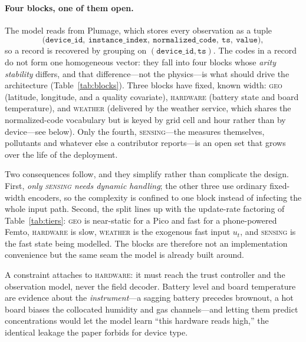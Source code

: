 \documentclass[10pt]{article}
\begin{document}
\paragraph{Four blocks, one of them open.}
The model reads from Plumage, which stores every observation as a tuple
\begin{equation}
\big(\texttt{device\_id},\ \texttt{instance\_index},\ \texttt{normalized\_code},\
\texttt{ts},\ \texttt{value}\big),
\label{eq:tuple}
\end{equation}
so a record is recovered by grouping on $(\texttt{device\_id},\texttt{ts})$. The
codes in a record do not form one homogeneous vector: they fall into four blocks
whose \emph{arity stability} differs, and that difference---not the physics---is
what should drive the architecture (Table~\ref{tab:blocks}). Three blocks have
fixed, known width: \textsc{geo} (latitude, longitude, and a quality covariate),
\textsc{hardware} (battery state and board temperature), and \textsc{weather}
(delivered by the weather service, which shares the normalized-code vocabulary but
is keyed by grid cell and hour rather than by device---see below). Only
the fourth, \textsc{sensing}---the measures themselves, pollutants and whatever
else a contributor reports---is an open set that grows over the life of the deployment.

Two consequences follow, and they simplify rather than complicate the design.
First, \emph{only \textsc{sensing} needs dynamic handling}; the other three use
ordinary fixed-width encoders, so the complexity is confined to one block instead
of infecting the whole input path. Second, the split lines up with the update-rate
factoring of Table~\ref{tab:tiers}: \textsc{geo} is near-static for a Pico and fast
for a phone-powered Femto, \textsc{hardware} is slow, \textsc{weather} is the exogenous
fast input $u_t$, and \textsc{sensing} is the fast state being modelled. The blocks
are therefore not an implementation convenience but the same seam the model is
already built around.

A constraint attaches to \textsc{hardware}: it must reach the trust controller and
the observation model, never the field decoder. Battery level and board
temperature are evidence about the \emph{instrument}---a sagging battery precedes
brownout, a hot board biases the collocated humidity and gas channels---and letting
them predict concentrations would let the model learn ``this hardware reads high,''
the identical leakage the paper forbids for device type.
\end{document}
